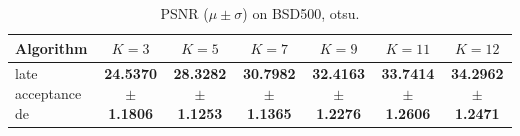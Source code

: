 \begin{table}[htbp]
\centering
\caption{PSNR ($\mu \pm \sigma$) on BSD500, otsu.}
\label{tab:exp1-otsu-psnr}
\begin{tabular}{lcccccc}
\toprule
Algorithm & $K=3$ & $K=5$ & $K=7$ & $K=9$ & $K=11$ & $K=12$ \\
\midrule
late acceptance de & \textbf{24.5370 $\pm$ 1.1806} & \textbf{28.3282 $\pm$ 1.1253} & \textbf{30.7982 $\pm$ 1.1365} & \textbf{32.4163 $\pm$ 1.2276} & \textbf{33.7414 $\pm$ 1.2606} & \textbf{34.2962 $\pm$ 1.2471} \\
\bottomrule
\end{tabular}
\end{table}